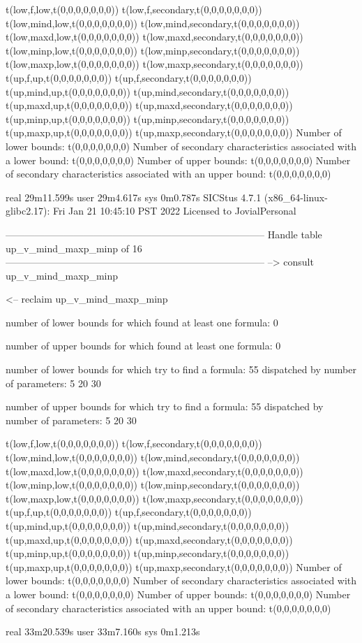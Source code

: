 t(low,f,low,t(0,0,0,0,0,0,0))
t(low,f,secondary,t(0,0,0,0,0,0,0))
t(low,mind,low,t(0,0,0,0,0,0,0))
t(low,mind,secondary,t(0,0,0,0,0,0,0))
t(low,maxd,low,t(0,0,0,0,0,0,0))
t(low,maxd,secondary,t(0,0,0,0,0,0,0))
t(low,minp,low,t(0,0,0,0,0,0,0))
t(low,minp,secondary,t(0,0,0,0,0,0,0))
t(low,maxp,low,t(0,0,0,0,0,0,0))
t(low,maxp,secondary,t(0,0,0,0,0,0,0))
t(up,f,up,t(0,0,0,0,0,0,0))
t(up,f,secondary,t(0,0,0,0,0,0,0))
t(up,mind,up,t(0,0,0,0,0,0,0))
t(up,mind,secondary,t(0,0,0,0,0,0,0))
t(up,maxd,up,t(0,0,0,0,0,0,0))
t(up,maxd,secondary,t(0,0,0,0,0,0,0))
t(up,minp,up,t(0,0,0,0,0,0,0))
t(up,minp,secondary,t(0,0,0,0,0,0,0))
t(up,maxp,up,t(0,0,0,0,0,0,0))
t(up,maxp,secondary,t(0,0,0,0,0,0,0))
Number of lower bounds:                                             t(0,0,0,0,0,0,0)
Number of secondary characteristics associated with a lower bound:  t(0,0,0,0,0,0,0)
Number of upper bounds:                                             t(0,0,0,0,0,0,0)
Number of secondary characteristics associated with an upper bound: t(0,0,0,0,0,0,0)

real	29m11.599s
user	29m4.617s
sys	0m0.787s
SICStus 4.7.1 (x86_64-linux-glibc2.17): Fri Jan 21 10:45:10 PST 2022
Licensed to JovialPersonal


--------------------------------------------------------------------------------
Handle table up_v_mind_maxp_minp of 16
--------------------------------------------------------------------------------
--> consult up_v_mind_maxp_minp

<-- reclaim up_v_mind_maxp_minp

number of lower bounds for which found at least one formula: 0

number of upper bounds for which found at least one formula: 0

number of lower bounds for which try to find a formula: 55
dispatched by number of parameters: 5  20  30

number of upper bounds for which try to find a formula: 55
dispatched by number of parameters: 5  20  30

t(low,f,low,t(0,0,0,0,0,0,0))
t(low,f,secondary,t(0,0,0,0,0,0,0))
t(low,mind,low,t(0,0,0,0,0,0,0))
t(low,mind,secondary,t(0,0,0,0,0,0,0))
t(low,maxd,low,t(0,0,0,0,0,0,0))
t(low,maxd,secondary,t(0,0,0,0,0,0,0))
t(low,minp,low,t(0,0,0,0,0,0,0))
t(low,minp,secondary,t(0,0,0,0,0,0,0))
t(low,maxp,low,t(0,0,0,0,0,0,0))
t(low,maxp,secondary,t(0,0,0,0,0,0,0))
t(up,f,up,t(0,0,0,0,0,0,0))
t(up,f,secondary,t(0,0,0,0,0,0,0))
t(up,mind,up,t(0,0,0,0,0,0,0))
t(up,mind,secondary,t(0,0,0,0,0,0,0))
t(up,maxd,up,t(0,0,0,0,0,0,0))
t(up,maxd,secondary,t(0,0,0,0,0,0,0))
t(up,minp,up,t(0,0,0,0,0,0,0))
t(up,minp,secondary,t(0,0,0,0,0,0,0))
t(up,maxp,up,t(0,0,0,0,0,0,0))
t(up,maxp,secondary,t(0,0,0,0,0,0,0))
Number of lower bounds:                                             t(0,0,0,0,0,0,0)
Number of secondary characteristics associated with a lower bound:  t(0,0,0,0,0,0,0)
Number of upper bounds:                                             t(0,0,0,0,0,0,0)
Number of secondary characteristics associated with an upper bound: t(0,0,0,0,0,0,0)

real	33m20.539s
user	33m7.160s
sys	0m1.213s
